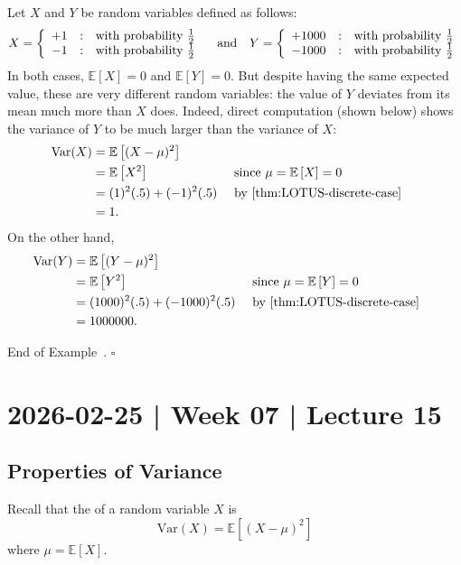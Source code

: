 \documentclass[10pt]{article}
\theoremstyle{definition}
\newtheorem{example}[theorem]{Example}
\renewenvironment{example}
{\begin{oldexample}}
  {\par\smallskip\hfill   End of Example~\theexample. $\square$    \par\end{oldexample}}
\newcommand{\1}[1]{\textbf{1}_{\left[#1\right]}} %
\def\E{\mathbb{E}} %
\def\Var{\mathrm{Var}} %
\newcommand{\dempfcolor}[1]{{\color{RoyalBlue}#1}}
\newcommand{\demph}[1]{\dempfcolor{{\sl \textbf{#1}}}}
\begin{document}
\begin{example}
  Let $X$ and $Y$ be random variables defined as follows:
  \begin{equation*}
    X = \left\{ \begin{array}{l@{\quad:\quad}l} +1 & \text{with probability
        }\frac{1}{2} \\ -1& \text{with probability }\frac{1}{2} \end{array}\right.
    \quad \text{and} \quad
    Y = \left\{ \begin{array}{l@{\quad:\quad}l} +1000 & \text{with probability
        }\frac{1}{2} \\ -1000& \text{with probability }\frac{1}{2} \end{array}\right.
  \end{equation*}
  In both cases, $\E\left[X \right]=0$ and $\E\left[Y \right] = 0$. But
  despite having the same expected value, these are very different random
  variables: the value of $Y$ deviates from its mean much more than $X$ does.
  Indeed, direct computation (shown below) shows the variance of $Y$ to be
  much larger than the variance of $X$:
  \begin{align*}
    \Var(X) 
    &= \E\left[(X- \mu)^{2} \right] \\
    &= \E\left[X^{2} \right] &&\text{ since $\mu= \E\left[X \right]=0$ }\\
    &= (1)^{2}(.5)+(-1)^{2}(.5) &&\text{ by \cref{thm:LOTUS-discrete-case} }\\
    &= 1.
  \end{align*}
  On the other hand,
  \begin{align*}
    \Var(Y) 
    &= \E\left[(Y- \mu)^{2} \right] \\
    &= \E\left[Y^{2} \right] &&\text{ since $\mu= \E\left[Y \right]=0$ }\\
    &= (1000)^{2}(.5)+(-1000)^{2}(.5) &&\text{ by \cref{thm:LOTUS-discrete-case} }\\
    &= 1000000.
  \end{align*}
\end{example}

\newpage
\section{2026-02-25 | Week 07 | Lecture 15}


\subsection{Properties of Variance}
Recall that the \demph{variance} of a random variable $X$ is
\begin{equation*}
  \Var(X) = \E\left[(X-\mu)^{2} \right]
\end{equation*}
where $\mu= \E\left[X \right]$.
\end{document}
